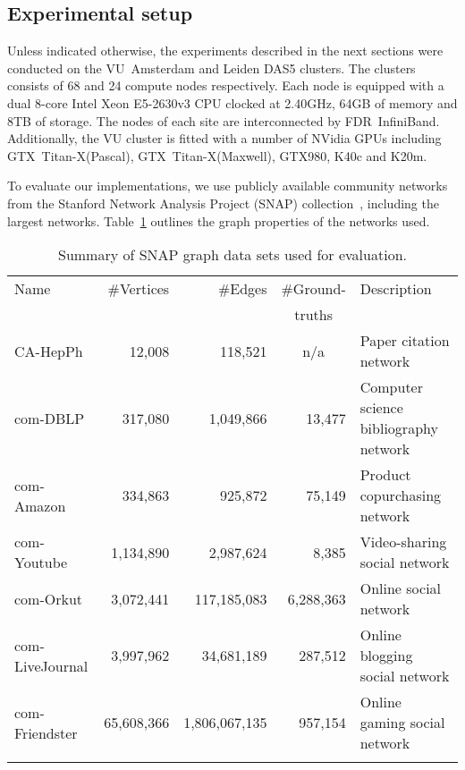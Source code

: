 \subsection{Experimental setup}
\label{sec-experimental}

Unless indicated otherwise, the experiments described in the next sections
were conducted on the VU~Amsterdam and Leiden DAS5 clusters.  The clusters
consists of 68 and 24 compute nodes respectively. Each node is equipped with
a dual 8-core Intel Xeon E5-2630v3 CPU clocked at 2.40GHz, 64GB of memory and
8TB of storage. The nodes of each site are interconnected by FDR~InfiniBand.
Additionally, the VU cluster is fitted with a number of NVidia GPUs including
GTX~\mbox{Titan-X(Pascal)},
GTX~\mbox{Titan-X(Maxwell)}, GTX980, K40c and K20m.

To evaluate our implementations, we use publicly available
community networks from the Stanford Network Analysis Project (SNAP)
collection~\cite{snapnets}, including the largest networks.
Table~\ref{table-snap}
outlines the graph properties of the networks used.

\begin{table}
  \centering
  \def\tabcolsep{0.2em}
  \begin{tabular}{l r r r p{9em}}
    Name            & \#Vertices &       \#Edges & \multicolumn{1}{c}{\#Ground-} & Description \\
                    &            &               & \multicolumn{1}{c}{truths}    &             \\
    \hline
    CA-HepPh        &    12,008  &    118,521    & \multicolumn{1}{c}{n/a}       & Paper citation network \\
    com-DBLP        &    317,080 &     1,049,866 & 13,477         & Computer science bibliography network \\
    com-Amazon      &    334,863 &       925,872 & 75,149         & Product copurchasing network \\
    com-Youtube     &  1,134,890 &     2,987,624 & 8,385          & Video-sharing social network \\
    com-Orkut       &  3,072,441 &   117,185,083 & 6,288,363      & Online social network \\
    com-LiveJournal &  3,997,962 &    34,681,189 & 287,512        & Online blogging social network \\
    com-Friendster  & 65,608,366 & 1,806,067,135 & 957,154        & Online gaming social network \\
    \hline
    \\[-1ex]
  \end{tabular}
  \caption{Summary of SNAP graph data sets used for evaluation.}
  \label{table-snap}
\end{table}

